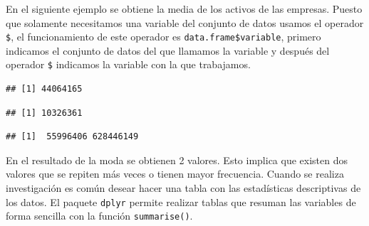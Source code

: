 \documentclass[
]{krantz}
\makeatletter
\newenvironment{Shaded}{\begin{snugshade}}{\end{snugshade}}
\newcommand{\DataTypeTok}[1]{\textcolor[rgb]{0.27,0.27,0.27}{#1}}
\newcommand{\KeywordTok}[1]{\textcolor[rgb]{0.27,0.27,0.27}{\textbf{#1}}}
\newcommand{\NormalTok}[1]{#1}
\newcommand{\OperatorTok}[1]{\textcolor[rgb]{0.43,0.43,0.43}{\textbf{#1}}}
\newcommand{\StringTok}[1]{\textcolor[rgb]{0.5,0.5,0.5}{#1}}
\newenvironment{kframe}{%
\medskip{}
\setlength{\fboxsep}{.8em}
 \def\at@end@of@kframe{}%
 \ifinner\ifhmode%
  \def\at@end@of@kframe{\end{minipage}}%
  \begin{minipage}{\columnwidth}%
 \fi\fi%
 \def\FrameCommand##1{\hskip\@totalleftmargin \hskip-\fboxsep
 \colorbox{shadecolor}{##1}\hskip-\fboxsep
     \hskip-\linewidth \hskip-\@totalleftmargin \hskip\columnwidth}%
 \MakeFramed {\advance\hsize-\width
   \@totalleftmargin\z@ \linewidth\hsize
   \@setminipage}}%
 {\par\unskip\endMakeFramed%
 \at@end@of@kframe}
\renewenvironment{Shaded}{\begin{kframe}}{\end{kframe}}
\makeatother
\begin{document}
En el siguiente ejemplo se obtiene la media de los activos de las empresas. Puesto que solamente necesitamos una variable del conjunto de datos usamos el operador \texttt{\$}, el funcionamiento de este operador es \texttt{data.frame\$variable}, primero indicamos el conjunto de datos del que llamamos la variable y después del operador \texttt{\$} indicamos la variable con la que trabajamos.

\begin{Shaded}
\end{Shaded}

\begin{verbatim}
## [1] 44064165
\end{verbatim}

\begin{Shaded}
\end{Shaded}

\begin{verbatim}
## [1] 10326361
\end{verbatim}

\begin{Shaded}
\end{Shaded}

\begin{verbatim}
## [1]  55996406 628446149
\end{verbatim}

En el resultado de la moda se obtienen 2 valores. Esto implica que existen dos valores que se repiten más veces o tienen mayor frecuencia. Cuando se realiza investigación es común desear hacer una tabla con las estadísticas descriptivas de los datos. El paquete \texttt{dplyr} permite realizar tablas que resuman las variables de forma sencilla con la función \texttt{summarise()}.

\begin{Shaded}
\end{Shaded}
\end{document}
